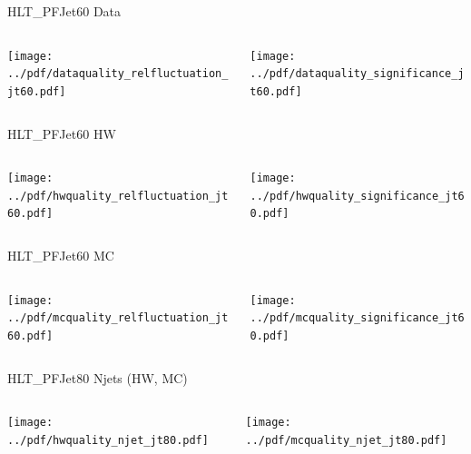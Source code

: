 \documentclass[9pt]{beamer}
\begin{document}
\begin{frame}[t]{HLT\_PFJet60 Data}
\begin{columns}[T]
  \begin{column}{.5\textwidth}
  \texttt{[image: ../pdf/dataquality\_relfluctuation\_jt60.pdf]}
  \end{column}
  \begin{column}{.5\textwidth}
  \texttt{[image: ../pdf/dataquality\_significance\_jt60.pdf]}
  \end{column}
\end{columns}
\end{frame}

\begin{frame}[t]{HLT\_PFJet60 HW}
\begin{columns}[T]
  \begin{column}{.5\textwidth}
  \texttt{[image: ../pdf/hwquality\_relfluctuation\_jt60.pdf]}
  \end{column}
  \begin{column}{.5\textwidth}
  \texttt{[image: ../pdf/hwquality\_significance\_jt60.pdf]}
  \end{column}
\end{columns}
\end{frame}

\begin{frame}[t]{HLT\_PFJet60 MC}
\begin{columns}[T]
  \begin{column}{.5\textwidth}
  \texttt{[image: ../pdf/mcquality\_relfluctuation\_jt60.pdf]}
  \end{column}
  \begin{column}{.5\textwidth}
  \texttt{[image: ../pdf/mcquality\_significance\_jt60.pdf]}
  \end{column}
\end{columns}
\end{frame}

\begin{frame}[t]{HLT\_PFJet80 Njets (HW, MC)}
\begin{columns}[T]
  \begin{column}{.5\textwidth}
  \texttt{[image: ../pdf/hwquality\_njet\_jt80.pdf]}
  \end{column}
  \begin{column}{.5\textwidth}
  \texttt{[image: ../pdf/mcquality\_njet\_jt80.pdf]}
  \end{column}
\end{columns}
\end{frame}
\end{document}

